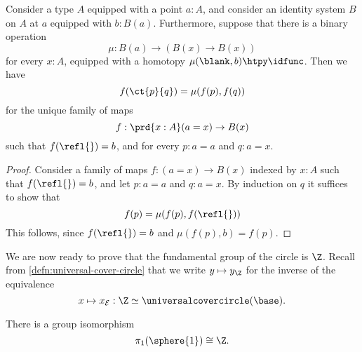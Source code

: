 \begin{prp}\label{prp:fundamental-theorem-id-with-operation}
  Consider a type $A$ equipped with a point $a:A$, and consider an identity system $B$ on $A$ at $a$ equipped with $b:B(a)$. Furthermore, suppose that there is a binary operation
  \begin{equation*}
    \mu:B(a)\to (B(x)\to B(x))
  \end{equation*}
  for every $x:A$, equipped with a homotopy $\mu(\blank,b)\htpy \idfunc$. Then we have
  \begin{equation*}
    f(\ct{p}{q})=\mu(f(p),f(q))
  \end{equation*}
  for the unique family of maps
  \begin{equation*}
    f:\prd{x:A}(a=x)\to B(x)
  \end{equation*}
  such that $f(\refl{})=b$, and for every $p:a=a$ and $q:a=x$.
\end{prp}

\begin{proof}
  Consider a family of maps $f:(a=x)\to B(x)$ indexed by $x:A$ such that $f(\refl{})=b$, and let $p:a=a$ and $q:a=x$. By induction on $q$ it suffices to show that
  \begin{equation*}
    f(p)=\mu(f(p),f(\refl{}))
  \end{equation*}
  This follows, since $f(\refl{})=b$ and $\mu(f(p),b)=f(p)$.
\end{proof}

We are now ready to prove that the fundamental group of the circle is $\Z$. Recall from \cref{defn:universal-cover-circle} that we write $y\mapsto y_\Z$ for the inverse of the equivalence
\begin{equation*}
  x\mapsto x_{\mathcal{E}}:\Z\simeq\universalcovercircle(\base).
\end{equation*}

\begin{thm}\label{thm:fundamental-group-circle}
  There is a group isomorphism
  \begin{equation*}
    \pi_1(\sphere{1})\cong \Z.
  \end{equation*}
\end{thm}

